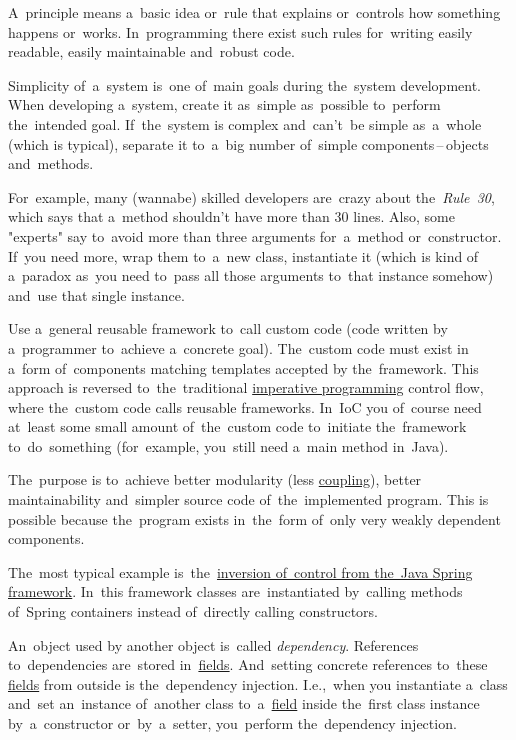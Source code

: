 A~principle means a~basic idea or~rule that explains or~controls how something happens or~works.
In~programming there exist such rules for~writing easily readable, easily maintainable and~robust code.

Simplicity of~a~system is~one of~main goals during the~system development.
When developing a~system, create it as~simple as~possible to~perform the~intended goal.
If~the~system is complex and~can't~be simple as~a~whole (which is typical), separate it to~a~big number of~simple components\,--\,objects and~methods.

For~example, many (wannabe) skilled developers are~crazy about the~\textit{Rule~30}, which says that a~method shouldn't have more than 30 lines.
Also, some "experts" say to~avoid more than three arguments for~a~method or~constructor.
If~you need more, wrap them to~a~new class, instantiate it (which is kind of a~paradox as~you need to~pass all those arguments to~that instance somehow) and~use that single instance.

\label{inversionofcontrol}
Use a~general reusable framework to~call custom code (code written by a~programmer to~achieve a~concrete goal).
The~custom code must exist in a~form of~components matching templates accepted by the~framework.
This approach is reversed to~the~traditional \hyperref[imperativeprogramming]{imperative programming} control flow, where the~custom code calls reusable frameworks.
In~IoC you of~course need at~least some small amount of~the~custom code to~initiate the~framework to~do~something (for~example, you~still need a~main method in~Java).

The~purpose is to~achieve better modularity (less \hyperref[loosetightcoupling]{coupling}), better maintainability and~simpler source code of~the~implemented program.
This is possible because the~program exists in~the~form of~only very weakly dependent components.

The~most typical example is~the~\hyperref[springinversionofcontrol]{inversion of~control from the~Java Spring framework}.
In~this framework classes are~instantiated by~calling methods of~Spring containers instead of~directly calling constructors.

\label{dependencyinjection}
An~object used by another object is~called \textit{dependency}.
References to~dependencies are~stored in~\hyperref[variablefieldproperty]{fields}.
And~setting concrete references to~these \hyperref[variablefieldproperty]{fields} from outside is the~dependency injection.
I.e.,~when you instantiate a~class and~set an~instance of~another class to~a~\hyperref[variablefieldproperty]{field} inside the~first class instance by~a~constructor or~by~a~setter, you~perform the~dependency injection.

